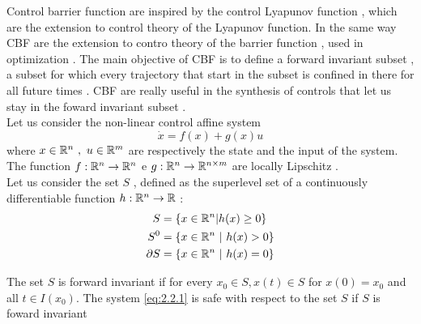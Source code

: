 Control barrier function are inspired by the control Lyapunov function , which are the extension to control theory  of the Lyapunov function. In the same way CBF are the extension to contro theory  of the barrier function , used in optimization . The main objective of CBF is to define a forward invariant subset , a subset for which every trajectory that start in the subset is confined in there for all future times . CBF are really useful in the synthesis of controls that let us stay in the foward invariant subset .  \\
Let us consider the non-linear control affine system 
\begin{equation}
	\label{eq:2.2.1}
	\dot{x} = f(x) + g(x) u 
\end{equation}
where $x \in \mathbb{R}^n \ , \ u \in \mathbb{R}^m$ are  respectively  the state  and the input of the system. The function  $f : \mathbb{R}^n \rightarrow \mathbb{R}^n$ e $g : \mathbb{R}^n \rightarrow \mathbb{R}^{n \times m}$ are locally Lipschitz  . \\
Let us consider the set   $S$  , defined  as the  superlevel set  of a continuously differentiable function $h : \mathbb{R}^n \rightarrow \mathbb{R}$ : 
\begin{align}
	\label{eq:2.2.2}
 	S &= \{ x \in \mathbb{R}^n | h(x) \geq 0 \} \\
	S^0 &= \{x \in \mathbb{R}^n \ | \ h(x) > 0 \} \\
	\label{eq:2.2.3}
	\partial S & = \{x \in \mathbb{R}^n \ | \ h(x)=0\}
\end{align}
\begin{definizione}
The set $S$ is forward invariant if for every $x_0 \in S , x(t) \in S $ for $x(0)=x_0$ and all $t \in I(x_0)$. The system \ref{eq:2.2.1} is safe with respect to the set $S$ if $S$ is foward invariant  
\end{definizione}

